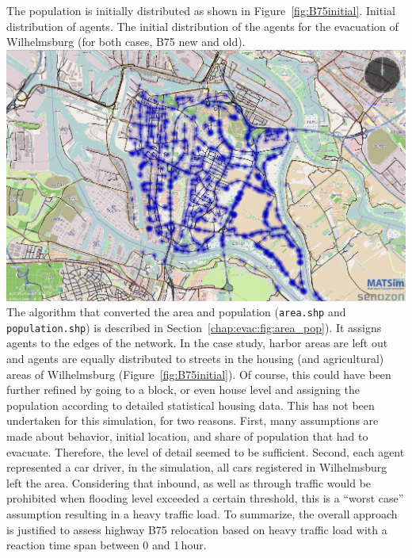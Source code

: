 The population is initially distributed as shown in Figure~\ref{fig:B75initial}. 
%
\createfigure%
{Initial distribution of agents.}%
{The initial distribution of the agents for the evacuation of Wilhelmsburg (for both cases, B75 new and old).}%
{\label{fig:B75initial}}%
{\includegraphics[width=0.7\linewidth]{scenarios/figures/B75initial}}%
{}
The algorithm that converted the area and population (\ie \lstinline|area.shp| and \lstinline|population.shp|) is described in Section~\ref{chap:evac:fig:area_pop}). It assigns agents to the edges of the network. In the case study, harbor areas are left out and agents are equally distributed to streets in the housing (and agricultural) areas of Wilhelmsburg (Figure~\ref{fig:B75initial}).
Of course, this could have been further refined by going to a block, or even house level and assigning the population according to detailed statistical housing data. This has not been undertaken for this simulation, for two reasons. First, many assumptions are made about behavior, initial location, and share of population that had to evacuate. Therefore, the level of detail seemed to be sufficient. Second, each agent represented a car driver, \ie in the simulation, all cars registered in Wilhelmsburg left the area. Considering that inbound, as well as through traffic would be prohibited when flooding level exceeded a certain threshold, this is a ``worst case'' assumption resulting in a heavy traffic load. To summarize, the overall approach is justified to assess highway B75 relocation based on heavy traffic load with a reaction time span between 0 and 1\,hour.

